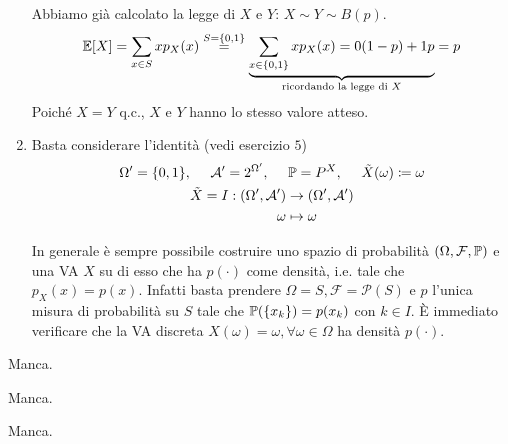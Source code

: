 \begin{enumerate}
Abbiamo già calcolato la legge di $X$ e $Y$: $X\sim Y\sim B( p)$.
\begin{equation*}
\mathbb{E}[ X] =\sum\limits _{x\in S} xp_{X}( x)\overset{S=\{0,1\}}{=}\underbrace{\sum\limits _{x\in \{0,1\}} xp_{X}( x) =0( 1-p) +1p}_{\text{ricordando la legge di } X} =p
\end{equation*}
Poiché $X=Y$ q.c., $X$ e $Y$ hanno lo stesso valore atteso.
\item Basta considerare l'identità (vedi esercizio $5$)
\begin{gather*}
\Omega '=\{0,1\} ,\ \ \ \ \mathcal{A} '=2^{\Omega '} ,\ \ \ \ \mathbb{P} =P^{X} ,\ \ \ \ \tilde{X}( \omega ) \coloneqq \omega \\
\begin{aligned}
\tilde{X} =I:( \Omega ',\mathcal{A} ') & \rightarrow ( \Omega ',\mathcal{A} ')\\
\omega  & \mapsto \omega 
\end{aligned}
\end{gather*}

\begin{oss}
In generale è sempre possibile costruire uno spazio di probabilità $( \Omega ,\mathcal{F} ,\mathbb{P})$ e una VA $X$ su di esso che ha $p( \cdotp )$ come densità, i.e. tale che $p_{X}( x) =p( x)$. Infatti basta prendere $\Omega =S,\mathcal{F} =\mathcal{P}( S)$ e $p$ l'unica misura di probabilità su $S$ tale che $\mathbb{P}(\{x_{k}\}) =p( x_{k})$ con $k\in I$. È immediato verificare che la VA discreta $X( \omega ) =\omega ,\forall \omega \in \Omega $ ha densità $p( \cdotp )$.
\end{oss}
\end{enumerate}

\Soluzione

Manca.

\Soluzione

Manca.

\Soluzione

Manca.

\Soluzione

